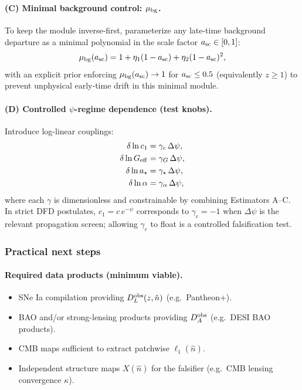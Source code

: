 \paragraph{(C) Minimal background control: $\mu_{\rm bg}$.}
To keep the module inverse-first, parameterize any late-time background departure as a minimal polynomial in the scale factor $a_{\rm sc}\in[0,1]$:
\begin{equation}
\mu_{\rm bg}(a_{\rm sc}) = 1+\eta_1(1-a_{\rm sc})+\eta_2(1-a_{\rm sc})^2,
\label{eq:psitomo-mu-bg}
\end{equation}
with an explicit prior enforcing $\mu_{\rm bg}(a_{\rm sc})\to 1$ for $a_{\rm sc}\le 0.5$ (equivalently $z\ge 1$) to prevent unphysical early-time drift in this minimal module.

\paragraph{(D) Controlled $\psi$-regime dependence (test knobs).}
Introduce log-linear couplings:
\begin{equation}
\begin{aligned}
\delta\ln c_{1} &= \gamma_c\,\Delta\psi,\\
\delta\ln G_{\rm eff} &= \gamma_G\,\Delta\psi,\\
\delta\ln a_\star &= \gamma_\star\,\Delta\psi,\\
\delta\ln \alpha &= \gamma_\alpha\,\Delta\psi,
\end{aligned}
\label{eq:psitomo-gammas}
\end{equation}
where each $\gamma$ is dimensionless and constrainable by combining Estimators A--C. In strict DFD postulates, $c_1=c\,e^{-\psi}$ corresponds to $\gamma_c=-1$ when $\Delta\psi$ is the relevant propagation screen; allowing $\gamma_c$ to float is a controlled falsification test.

\subsubsection{Practical next steps}\label{sec:psitomo-nextsteps}

\paragraph{Required data products (minimum viable).}
\begin{itemize}
\item SNe Ia compilation providing $D_L^{\rm obs}(z,\hat n)$ (e.g.\ Pantheon+).\cite{PantheonPlus2022,PantheonPlusConstraints}
\item BAO and/or strong-lensing products providing $D_A^{\rm obs}$ (e.g.\ DESI BAO products).\cite{DESI2024BAO}
\item CMB maps sufficient to extract patchwise $\ell_1(\hat n)$.\cite{Planck2018VI}
\item Independent structure maps $X(\hat n)$ for the falsifier (e.g.\ CMB lensing convergence $\kappa$).\cite{ACTDR6Lensing}
\end{itemize}

